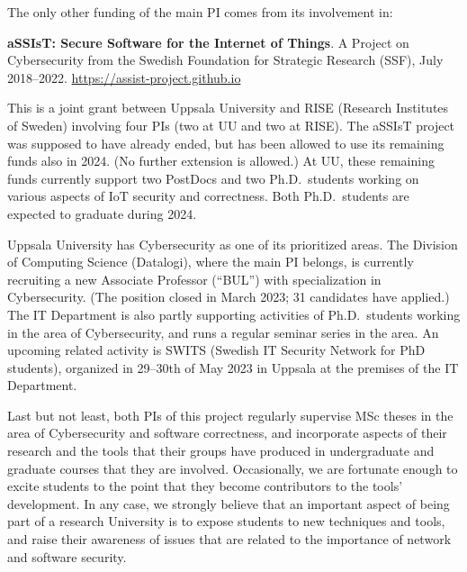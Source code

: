 \documentclass[11pt]{article}
\newcommand{\myparagraph}{}
\let\myparagraph=\paragraph
\renewcommand{\paragraph}{\vspace{-3mm}\myparagraph}
\begin{document}
\noindent
The only other funding of the main PI comes from its involvement in:
\vspace*{-.5em}
\begin{quoting}
  \textbf{aSSIsT: Secure Software for the Internet of Things}.
  A Project on Cybersecurity from the Swedish Foundation for Strategic
  Research (SSF), July 2018--2022. \url{https://assist-project.github.io}
\end{quoting}
\vspace*{-.5em}
%
This is a joint grant between Uppsala University and RISE (Research Institutes
of Sweden) involving four PIs (two at UU and two at RISE).  The aSSIsT project
was supposed to have already ended, but has been allowed to use its remaining
funds also in 2024. (No further extension is allowed.) At UU, these remaining
funds currently support two PostDocs and two Ph.D.\ students working on
various aspects of IoT security and correctness.  Both Ph.D.\ students are
expected to graduate during 2024.

Uppsala University has Cybersecurity as one of its prioritized areas.  The
Division of Computing Science (Datalogi), where the main PI belongs, is
currently recruiting a new Associate Professor (``BUL'') with specialization
in Cybersecurity. (The position closed in March 2023; 31 candidates have
applied.)  The IT Department is also partly supporting activities of
Ph.D.\ students working in the area of Cybersecurity, and runs a regular
seminar series in the area.  An upcoming related activity is SWITS (Swedish IT
Security Network for PhD students), organized in 29--30th of May 2023 in
Uppsala at the premises of the IT Department.

Last but not least, both PIs of this project regularly supervise MSc theses in
the area of Cybersecurity and software correctness, and incorporate aspects of
their research and the tools that their groups have produced in undergraduate
and graduate courses that they are involved.  Occasionally, we are fortunate
enough to excite students to the point that they become contributors to the
tools' development. In any case, we strongly believe that an important aspect
of being part of a research University is to expose students to new techniques
and tools, and raise their awareness of issues that are related to the
importance of network and software security.




\end{document}
